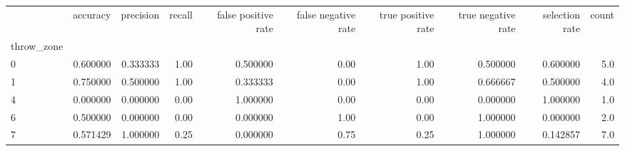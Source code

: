 \begin{tabular}{lrrrrrrrrr}
\toprule
{} &  accuracy &  precision &  recall &  false positive rate &  false negative rate &  true positive rate &  true negative rate &  selection rate &  count \\
throw\_zone &           &            &         &                      &                      &                     &                     &                 &        \\
\midrule
0          &  0.600000 &   0.333333 &    1.00 &             0.500000 &                 0.00 &                1.00 &            0.500000 &        0.600000 &    5.0 \\
1          &  0.750000 &   0.500000 &    1.00 &             0.333333 &                 0.00 &                1.00 &            0.666667 &        0.500000 &    4.0 \\
4          &  0.000000 &   0.000000 &    0.00 &             1.000000 &                 0.00 &                0.00 &            0.000000 &        1.000000 &    1.0 \\
6          &  0.500000 &   0.000000 &    0.00 &             0.000000 &                 1.00 &                0.00 &            1.000000 &        0.000000 &    2.0 \\
7          &  0.571429 &   1.000000 &    0.25 &             0.000000 &                 0.75 &                0.25 &            1.000000 &        0.142857 &    7.0 \\
\bottomrule
\end{tabular}

